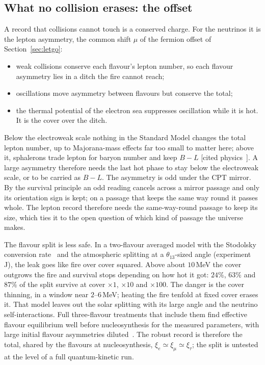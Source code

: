 \documentclass[11pt]{article}
\theoremstyle{definition}\newtheorem{hypothesis}{Hypothesis}\newtheorem{prediction}{Prediction}
\theoremstyle{remark}\newtheorem{remark}[theorem]{Remark}
\newcommand{\grade}[1]{\textsf{\small[#1]}}
\begin{document}
\subsection{What no collision erases: the offset}
A record that collisions cannot touch is a conserved charge. For the neutrinos it is the lepton asymmetry, the common shift $\mu$ of the fermion offset of Section~\ref{sec:letgo}:
\begin{itemize}[nosep]
\item weak collisions conserve each flavour's lepton number, so each flavour asymmetry lies in a ditch the fire cannot reach;
\item oscillations move asymmetry between flavours but conserve the total;
\item the thermal potential of the electron sea suppresses oscillation while it is hot. It is the cover over the ditch.
\end{itemize}
Below the electroweak scale nothing in the Standard Model changes the total lepton number, up to Majorana-mass effects far too small to matter here; above it, sphalerons trade lepton for baryon number and keep $B-L$ \grade{cited physics~\cite{Dolgov}}. A large asymmetry therefore needs the last hot phase to stay below the electroweak scale, or to be carried as $B-L$. The asymmetry is odd under the CPT mirror. By the survival principle an odd reading cancels across a mirror passage and only its orientation sign is kept; on a passage that keeps the same way round it passes whole. The lepton record therefore needs the same-way-round passage to keep its size, which ties it to the open question of which kind of passage the universe makes.

The flavour split is less safe. In a two-flavour averaged model with the Stodolsky conversion rate~\cite{Stod} and the atmospheric splitting at a $\theta_{13}$-sized angle (experiment J), the leak goes like fire over cover squared. Above about $10$\,MeV the cover outgrows the fire and survival stops depending on how hot it got: $24\%$, $63\%$ and $87\%$ of the split survive at cover $\times1$, $\times10$ and $\times100$. The danger is the cover thinning, in a window near $2$--$6$\,MeV; heating the fire tenfold at fixed cover erases it. That model leaves out the solar splitting with its large angle and the neutrino self-interactions. Full three-flavour treatments that include them find effective flavour equilibrium well before nucleosynthesis for the measured parameters, with large initial flavour asymmetries diluted~\cite{Dolgov2,Castorina}. The robust record is therefore the total, shared by the flavours at nucleosynthesis, $\xi_e\simeq\xi_\mu\simeq\xi_\tau$; the split is untested at the level of a full quantum-kinetic run.
\end{document}
